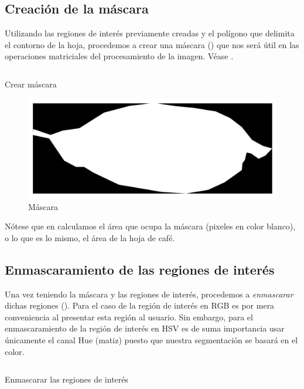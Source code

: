 \subsection{Creación de la máscara}
Utilizando las regiones de interés previamente creadas y el polígono que delimita el contorno de la hoja, procedemos a crear una máscara () que nos será útil en las operaciones matriciales del procesamiento de la imagen. Véase .

\begin{listing}[H]
\inputminted{python}{code_listings/mask.py}
\caption{Crear máscara}
\label{code:mask}
\end{listing}

\begin{figure}[H]
\centering
\includegraphics[scale=1]{images/mask.png}
\caption{Máscara}
\label{img:mask}
\end{figure}

Nótese que en  calculamos el área que ocupa la máscara (pixeles en color blanco), o lo que es lo mismo, el área de la hoja de café.

\subsection{Enmascaramiento de las regiones de interés}
Una vez teniendo la máscara y las regiones de interés, procedemos a \textit{enmascarar} dichas regiones (). Para el caso de la región de interés en \textsf{RGB} es por mera conveniencia al presentar esta región al usuario. Sin embargo, para el enmascaramiento de la región de interés en \textsf{HSV} es de suma importancia usar únicamente el canal Hue (matiz) puesto que nuestra segmentación se basará en el color.

\begin{listing}[H]
\inputminted{python}{code_listings/masked_roi.py}
\caption{Enmascarar las regiones de interés}
\label{code:masked_roi}
\end{listing}

